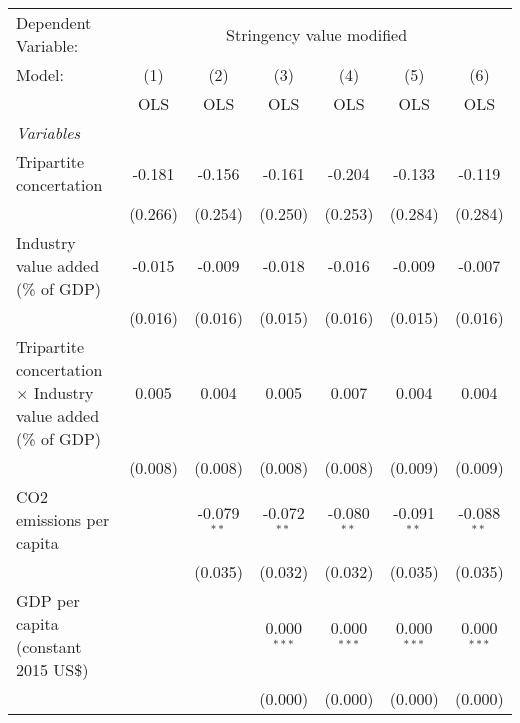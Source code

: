 
\begingroup
\centering
\begin{tabular}{lcccccc}
   \toprule
   Dependent Variable: & \multicolumn{6}{c}{Stringency value modified}\\
   Model:                                                              & (1)     & (2)           & (3)           & (4)           & (5)            & (6)\\  
                                                                       &  OLS    & OLS           & OLS           & OLS           & OLS            & OLS\\  
   \midrule
   \emph{Variables}\\
   Tripartite concertation                                             & -0.181  & -0.156        & -0.161        & -0.204        & -0.133         & -0.119\\   
                                                                       & (0.266) & (0.254)       & (0.250)       & (0.253)       & (0.284)        & (0.284)\\   
   Industry value added (\% of GDP)                                    & -0.015  & -0.009        & -0.018        & -0.016        & -0.009         & -0.007\\   
                                                                       & (0.016) & (0.016)       & (0.015)       & (0.016)       & (0.015)        & (0.016)\\   
   Tripartite concertation $\times$ Industry value added (\% of GDP)   & 0.005   & 0.004         & 0.005         & 0.007         & 0.004          & 0.004\\   
                                                                       & (0.008) & (0.008)       & (0.008)       & (0.008)       & (0.009)        & (0.009)\\   
   CO2 emissions per capita                                            &         & -0.079$^{**}$ & -0.072$^{**}$ & -0.080$^{**}$ & -0.091$^{**}$  & -0.088$^{**}$\\   
                                                                       &         & (0.035)       & (0.032)       & (0.032)       & (0.035)        & (0.035)\\   
   GDP per capita (constant 2015 US\$)                                 &         &               & 0.000$^{***}$ & 0.000$^{***}$ & 0.000$^{***}$  & 0.000$^{***}$\\   
                                                                       &         &               & (0.000)       & (0.000)       & (0.000)        & (0.000)\\   

\end{tabular}
